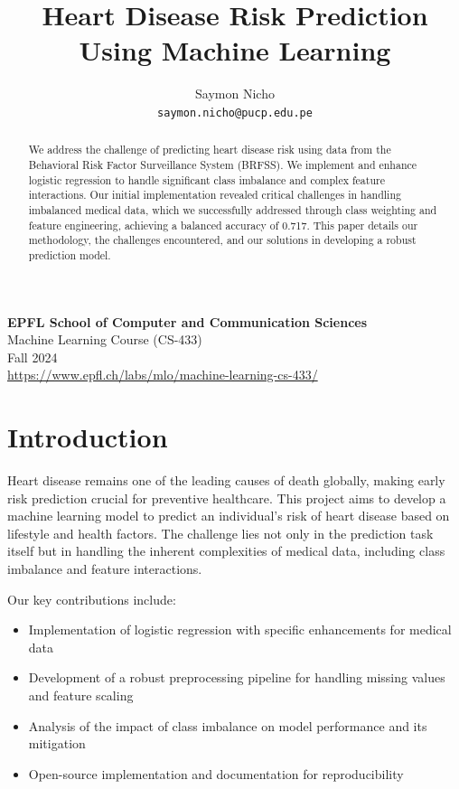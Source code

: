 \documentclass[10pt,conference,compsocconf]{IEEEtran}
\begin{document}
\title{Heart Disease Risk Prediction Using Machine Learning}

\author{
    Saymon Nicho\\
    \texttt{saymon.nicho@pucp.edu.pe}
}

\maketitle

\begin{center}
\textbf{EPFL School of Computer and Communication Sciences}\\
Machine Learning Course (CS-433)\\
Fall 2024\\
\url{https://www.epfl.ch/labs/mlo/machine-learning-cs-433/}
\end{center}

\vspace{1em}

\begin{abstract}
We address the challenge of predicting heart disease risk using data from the
Behavioral Risk Factor Surveillance System (BRFSS). We implement and enhance
logistic regression to handle significant class imbalance and complex feature interactions.
Our initial implementation revealed critical challenges in handling imbalanced medical data,
which we successfully addressed through class weighting and feature engineering,
achieving a balanced accuracy of 0.717. This paper details our methodology,
the challenges encountered, and our solutions in developing a robust prediction model.
\end{abstract}

\section{Introduction}

Heart disease remains one of the leading causes of death globally, making early risk
prediction crucial for preventive healthcare. This project aims to develop a
machine learning model to predict an individual's risk of heart disease based on
lifestyle and health factors. The challenge lies not only in the prediction task itself
but in handling the inherent complexities of medical data, including class imbalance and
feature interactions.

Our key contributions include:
\begin{itemize}
    \item Implementation of logistic regression with specific enhancements for medical data
    \item Development of a robust preprocessing pipeline for handling missing values and
    feature scaling
    \item Analysis of the impact of class imbalance on model performance and its mitigation
    \item Open-source implementation and documentation for reproducibility
\end{itemize}
\end{document}
